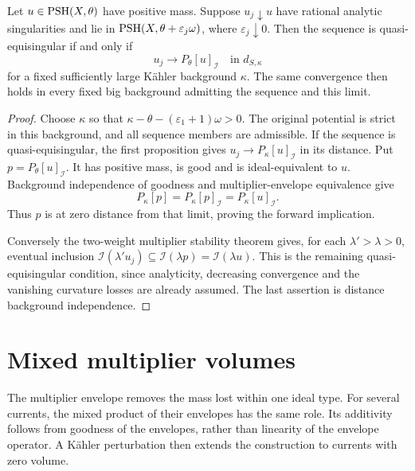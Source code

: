 \begin{proposition}\label{prop:quasi-equisingular-distance-characterization}
Let $u\in\mathrm{PSH}(X,\theta)$ have positive mass. Suppose $u_j\downarrow u$ have rational analytic singularities and lie in $\mathrm{PSH}(X,\theta+\varepsilon_j\omega)$, where $\varepsilon_j\downarrow0$. Then the sequence is quasi-equisingular if and only if
\[
 u_j\longrightarrow P_\theta[u]_{\mathcal I}\quad\text{in }d_{S,\kappa}
\]
for a fixed sufficiently large K\"ahler background $\kappa$. The same convergence then holds in every fixed big background admitting the sequence and this limit.
\end{proposition}
\begin{proof}
Choose $\kappa$ so that $\kappa-\theta-(\varepsilon_1+1)\omega>0$. The original potential is strict in this background, and all sequence members are admissible. If the sequence is quasi-equisingular, the first proposition gives
$u_j\to P_\kappa[u]_{\mathcal I}$ in its distance. Put $p=P_\theta[u]_{\mathcal I}$. It has positive mass, is good and is ideal-equivalent to $u$. Background independence of goodness and multiplier-envelope equivalence give
\[
 P_\kappa[p]=P_\kappa[p]_{\mathcal I}=P_\kappa[u]_{\mathcal I}.
\]
Thus $p$ is at zero distance from that limit, proving the forward implication.

Conversely the two-weight multiplier stability theorem gives, for each $\lambda'>\lambda>0$, eventual inclusion
$\mathcal I(\lambda'u_j)\subseteq\mathcal I(\lambda p)=\mathcal I(\lambda u)$.
This is the remaining quasi-equisingular condition, since analyticity, decreasing convergence and the vanishing curvature losses are already assumed. The last assertion is distance background independence.
\end{proof}

\section{Mixed multiplier volumes}
\label{sec:mixed-multiplier-volumes}
The multiplier envelope removes the mass lost within one ideal type. For several currents, the mixed product of their envelopes has the same role. Its additivity follows from goodness of the envelopes, rather than linearity of the envelope operator. A K\"ahler perturbation then extends the construction to currents with zero volume.


